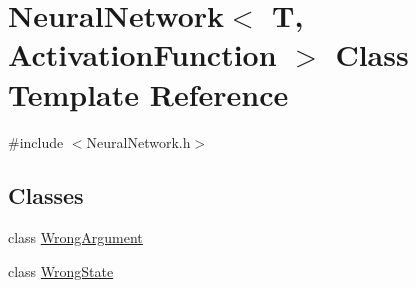 \hypertarget{class_neural_network}{\section{\-Neural\-Network$<$ \-T, \-Activation\-Function $>$ \-Class \-Template \-Reference}
\label{class_neural_network}
}


{\ttfamily \#include $<$\-Neural\-Network.\-h$>$}

\subsection*{\-Classes}
\begin{DoxyCompactItemize}
\item 
class \hyperlink{class_neural_network_1_1_wrong_argument}{\-Wrong\-Argument}
\item 
class \hyperlink{class_neural_network_1_1_wrong_state}{\-Wrong\-State}
\end{DoxyCompactItemize}
